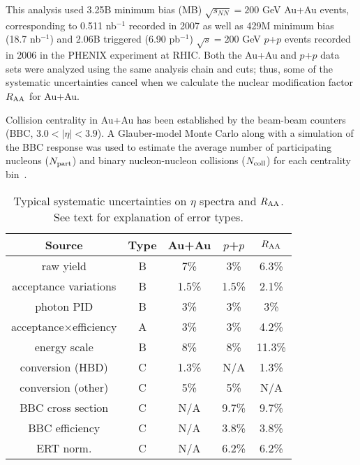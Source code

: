 \documentclass[aps,prc,superscriptaddress,showpacs,nofootinbib,floatfix,twocolumn]{revtex4}
\def\raa{$R_{\rm AA}$}
\def\raas{$R_{\rm AA}$ }
\def\pp{$p$+$p$ }
\def\hs{$\eta$ }
\begin{document}
This analysis used 3.25B minimum bias (MB) $\sqrt{s_{NN}}=200$ GeV 
Au+Au events, corresponding to 0.511 nb$^{-1}$ recorded in 2007 as 
well as 429M minimum bias (18.7 nb$^{-1}$) and 2.06B triggered (6.90 
pb$^{-1}$) $\sqrt{s}=200$ GeV \pp events recorded in 2006 in the 
PHENIX experiment at RHIC.  Both the Au+Au and \pp data sets were 
analyzed using the same analysis chain and cuts; thus, some of the 
systematic uncertainties cancel when we calculate the nuclear 
modification factor \raas for Au+Au.

Collision centrality in Au+Au has been established by the beam-beam 
counters~\cite{nimbbc} (BBC, $3.0<|\eta|<3.9$).  A Glauber-model Monte 
Carlo along with a simulation of the BBC response was used to estimate 
the average number of participating nucleons ($N_{\rm part}$) and 
binary nucleon-nucleon collisions ($N_{\rm coll}$) for each centrality 
bin~\cite{ppg026}.

\begin{table}[tbh]
\caption{\label{table:syst_spec_raa}
    Typical systematic uncertainties on \hs spectra and \raa.  See
 text for explanation of error types.
 }
\begin{ruledtabular}
\begin{tabular}{ccccc}
  Source                 & Type &  Au+Au & \pp & \raas \\ \hline
  raw yield              &  B   &  7\%    & 3\% & 6.3\% \\
  acceptance variations  &  B   &  1.5\%  & 1.5\% & 2.1\% \\
  photon PID             &  B   &  3\%    & 3\% & 3\% \\
  acceptance$\times$efficiency  &  A   &  3\%    & 3\% & 4.2\% \\
  energy scale           &  B   &  8\%    & 8\% & 11.3\% \\
  conversion (HBD)       &  C   &  1.3\%  & N/A & 1.3\% \\
  conversion (other)     &  C   &  5\%    & 5\% & N/A \\
  BBC cross section      &  C   &  N/A    & 9.7\% & 9.7\% \\
  BBC efficiency         &  C   &  N/A    & 3.8\% & 3.8\% \\
  ERT norm.              &  C   &  N/A    & 6.2\% & 6.2\% \\
 \end{tabular}
\end{ruledtabular}
\end{table}
\end{document}
